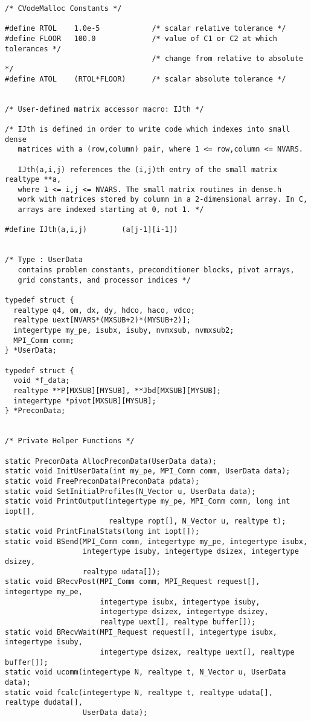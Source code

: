 \begin{verbatim}
/* CVodeMalloc Constants */

#define RTOL    1.0e-5            /* scalar relative tolerance */
#define FLOOR   100.0             /* value of C1 or C2 at which tolerances */
                                  /* change from relative to absolute      */
#define ATOL    (RTOL*FLOOR)      /* scalar absolute tolerance */


/* User-defined matrix accessor macro: IJth */

/* IJth is defined in order to write code which indexes into small dense
   matrices with a (row,column) pair, where 1 <= row,column <= NVARS.   

   IJth(a,i,j) references the (i,j)th entry of the small matrix realtype **a,
   where 1 <= i,j <= NVARS. The small matrix routines in dense.h
   work with matrices stored by column in a 2-dimensional array. In C,
   arrays are indexed starting at 0, not 1. */

#define IJth(a,i,j)        (a[j-1][i-1])


/* Type : UserData 
   contains problem constants, preconditioner blocks, pivot arrays, 
   grid constants, and processor indices */

typedef struct {
  realtype q4, om, dx, dy, hdco, haco, vdco;
  realtype uext[NVARS*(MXSUB+2)*(MYSUB+2)];
  integertype my_pe, isubx, isuby, nvmxsub, nvmxsub2;
  MPI_Comm comm;
} *UserData;

typedef struct {
  void *f_data;
  realtype **P[MXSUB][MYSUB], **Jbd[MXSUB][MYSUB];
  integertype *pivot[MXSUB][MYSUB];
} *PreconData;


/* Private Helper Functions */

static PreconData AllocPreconData(UserData data);
static void InitUserData(int my_pe, MPI_Comm comm, UserData data);
static void FreePreconData(PreconData pdata);
static void SetInitialProfiles(N_Vector u, UserData data);
static void PrintOutput(integertype my_pe, MPI_Comm comm, long int iopt[],
                        realtype ropt[], N_Vector u, realtype t);
static void PrintFinalStats(long int iopt[]);
static void BSend(MPI_Comm comm, integertype my_pe, integertype isubx, 
                  integertype isuby, integertype dsizex, integertype dsizey, 
                  realtype udata[]);
static void BRecvPost(MPI_Comm comm, MPI_Request request[], integertype my_pe,
                      integertype isubx, integertype isuby,
                      integertype dsizex, integertype dsizey,
                      realtype uext[], realtype buffer[]);
static void BRecvWait(MPI_Request request[], integertype isubx, integertype isuby,
                      integertype dsizex, realtype uext[], realtype buffer[]);
static void ucomm(integertype N, realtype t, N_Vector u, UserData data);
static void fcalc(integertype N, realtype t, realtype udata[], realtype dudata[], 
                  UserData data);


\end{verbatim}
